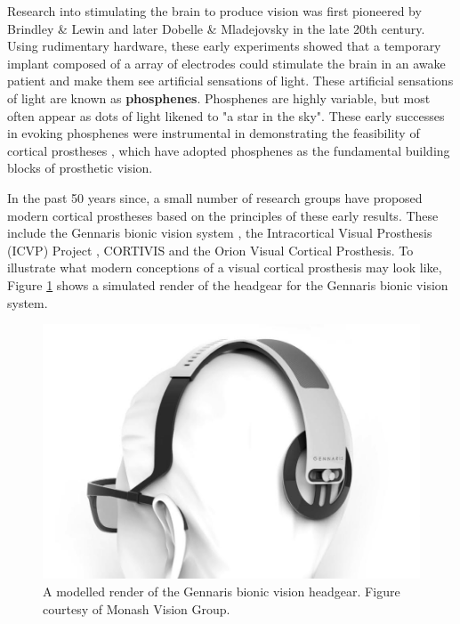 \documentclass[a4paper,11pt,openany]{book}
\begin{document}
Research into stimulating the brain to produce vision was first pioneered by Brindley \& Lewin \cite{brindley_sensations_1968} and later Dobelle \& Mladejovsky \cite{dobelle_phosphenes_1974} in the late 20th century.
Using rudimentary hardware, these early experiments showed that a temporary implant composed of a array of electrodes could stimulate the brain in an awake patient and make them see artificial sensations of light. \cite{brindley_sensations_1968,dobelle_phosphenes_1974}
These artificial sensations of light are known as \textbf{phosphenes}.
Phosphenes are highly variable, but most often appear as dots of light likened to "a star in the sky". \cite{dobelle_phosphenes_1974}
These early successes in evoking phosphenes were instrumental in demonstrating the feasibility of cortical prostheses \cite{schmidt_feasibility_1996}, which have adopted phosphenes as the fundamental building blocks of prosthetic vision.

In the past 50 years since, a small number of research groups have proposed modern cortical prostheses based on the principles of these early results.
These include the Gennaris bionic vision system \cite{lowery_restoration_2015,lowery_monash_2017}, the Intracortical Visual Prosthesis (ICVP) Project \cite{troyk_intracortical_2017}, CORTIVIS \cite{fernandez_cortivis_2017} and the Orion Visual Cortical Prosthesis. \cite{secondsight_second_nodate}
To illustrate what modern conceptions of a visual cortical prosthesis may look like, Figure \ref{fig:org1ac6c80} shows a simulated render of the headgear for the Gennaris bionic vision system.

\begin{figure}[htbp]
\centering
\includegraphics[width=.9\linewidth]{./graphics/litreview/headgear2.jpg}
\caption{\label{fig:org1ac6c80}
A modelled render of the Gennaris bionic vision headgear. Figure courtesy of Monash Vision Group.}
\end{figure}
\end{document}
